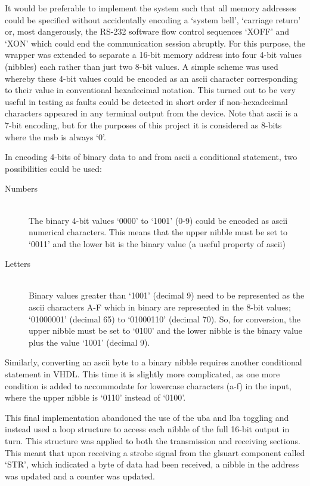 It would be preferable to implement the system such that all memory
addresses could be specified without accidentally encoding a `system bell',
`carriage return' or, most dangerously, the RS-232 software flow control sequences
`XOFF' and `XON' which could end the communication session abruptly.
For this purpose, the wrapper was extended to separate a 16-bit memory address into four
4-bit values (nibbles) each rather than just two 8-bit values. A simple scheme was used
whereby these 4-bit values could be encoded as an \gls{ascii} character corresponding to their
value in conventional hexadecimal notation. This turned out to be very useful in testing
as faults could be detected in short order if non-hexadecimal characters appeared in
any terminal output from the device. Note that \gls{ascii} is a 7-bit encoding, but for
the purposes of this project it is considered as 8-bits where the \gls{msb} is always `0'.

In encoding 4-bits of binary data to and from \gls{ascii} a conditional statement,
two possibilities could be used:
\begin{description}
\item[Numbers] \hfill \\
  The binary 4-bit values `0000' to `1001' (0-9) could be encoded as \gls{ascii} numerical
  characters. This means that the upper nibble must be set to `0011' and the lower bit is
  the binary value (a useful property of \gls{ascii})
\item[Letters] \hfill \\
  Binary values greater than `1001' (decimal 9) need to be represented as the \gls{ascii}
  characters A-F which in binary are represented in the 8-bit values; `01000001' (decimal 65) to
  `01000110' (decimal 70). So, for conversion, the upper nibble must be set to `0100' and
  the lower nibble is the binary value plus the value `1001' (decimal 9).
\end{description}

Similarly, converting an \gls{ascii} byte to a binary nibble requires another conditional
statement in VHDL. This time it is slightly more complicated, as one more condition is
added to accommodate for lowercase characters (a-f) in the input,
where the upper nibble is `0110' instead of `0100'.

This final implementation abandoned the use of the \gls{uba} and \gls{lba} toggling and
instead used a loop structure to access each nibble of the full 16-bit output in turn.
This structure was applied to both the transmission and receiving sections. This meant
that upon receiving a strobe signal from the gls{uart} component called `STR', which
indicated a byte of data had been received, a nibble in the address was updated and
a counter was updated.


